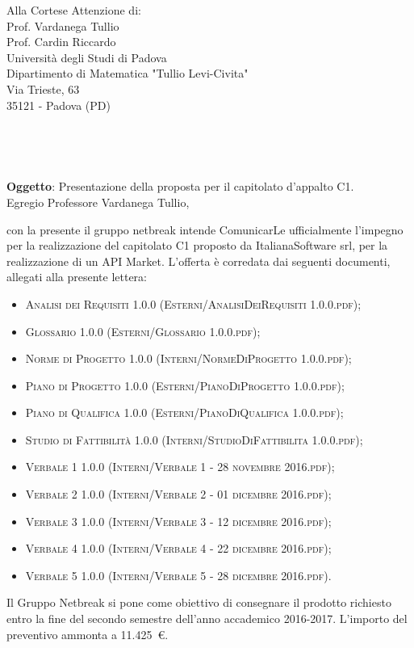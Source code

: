 \documentclass[11pt,a4paper]{letter}
\def\opening#1{\thispagestyle{empty}
{\centering\fromaddress \vspace{0.6in} \\ %
\hspace*{\longindentation}\hspace*{\fill}\par} %
{\raggedright \toname \\ \toaddress \par} %
\vspace{0.1in} %
\noindent #1 %
}
\begin{document}

\begin{letter}
{Alla Cortese Attenzione di:\\
	Prof. Vardanega Tullio\\
	Prof. Cardin Riccardo\\
	Universit\`a degli Studi di Padova\\
	 Dipartimento di Matematica "Tullio Levi-Civita"\\
	Via Trieste, 63\\
	35121 - Padova (PD)\\
}



\opening {\textbf{Oggetto}: Presentazione della proposta per il capitolato d'appalto C1.}\\

\noindent Egregio Professore Vardanega Tullio,

\indent con la presente il gruppo netbreak intende ComunicarLe ufficialmente l'impegno per la realizzazione del capitolato C1 proposto da ItalianaSoftware srl, per la realizzazione di un API Market.
L'offerta \`e corredata dai seguenti documenti, allegati alla presente lettera:
\begin{itemize}
	\item \textsc{Analisi dei Requisiti 1.0.0 (Esterni/AnalisiDeiRequisiti 1.0.0.pdf)}; 
	\item \textsc{Glossario 1.0.0 (Esterni/Glossario 1.0.0.pdf)}; 
	\item \textsc{Norme di Progetto 1.0.0 (Interni/NormeDiProgetto 1.0.0.pdf)}; 
	\item \textsc{Piano di Progetto 1.0.0 (Esterni/PianoDiProgetto 1.0.0.pdf)}; 
	\item \textsc{Piano di Qualifica 1.0.0 (Esterni/PianoDiQualifica 1.0.0.pdf)}; 
	\item \textsc{Studio di Fattibilit\`a 1.0.0 (Interni/StudioDiFattibilita 1.0.0.pdf)}; 
	\item \textsc{Verbale 1 1.0.0 (Interni/Verbale 1 - 28 novembre 2016.pdf)}; 
	\item \textsc{Verbale 2 1.0.0 (Interni/Verbale 2 - 01 dicembre 2016.pdf)}; 
	\item \textsc{Verbale 3 1.0.0 (Interni/Verbale 3 - 12 dicembre 2016.pdf)}; 
	\item \textsc{Verbale 4 1.0.0 (Interni/Verbale 4 - 22 dicembre 2016.pdf)}; 
	\item \textsc{Verbale 5 1.0.0 (Interni/Verbale 5 - 28 dicembre 2016.pdf)}. 
\end{itemize}
	Il Gruppo Netbreak si pone come obiettivo di consegnare il prodotto richiesto entro la fine del secondo semestre dell'anno accademico 2016-2017. L'importo del preventivo ammonta a \hbox{11.425 \euro{}.}


\end{letter}
\end{document}
